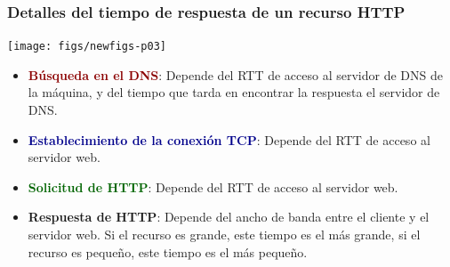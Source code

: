 \documentclass[hyperref={pdfpagelabels=true},ucs]{beamer}
\newcommand{\res}[1]{\textcolor{darkred}{#1}}
\begin{document}
\begin{frame}[fragile]
\frametitle{Detalles del tiempo de respuesta de un recurso HTTP}


\vspace{-3mm}
\begin{center}
\texttt{[image: figs/newfigs-p03]}
\end{center}

\begin{itemize}
\item \res{\textbf{Búsqueda en el DNS}}: Depende del RTT de acceso al servidor de
  DNS de la máquina, y del tiempo que tarda en encontrar la respuesta
  el servidor de DNS.
\item \textcolor{darkblue}{\textbf{Establecimiento de la conexión TCP}}: Depende del RTT de
  acceso al servidor web.
\item \textcolor{darkgreen}{\textbf{Solicitud de HTTP}}: Depende del RTT de
  acceso al servidor web.
\item \textbf{Respuesta de HTTP}: Depende del ancho de banda entre
  el cliente y el servidor web. Si el recurso es grande, este tiempo
  es el más grande, si el recurso es pequeño, este tiempo es el más
  pequeño. 

\end{itemize}



\end{frame}



\end{document}
